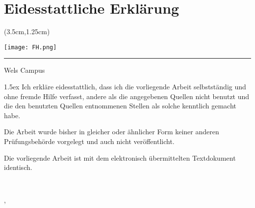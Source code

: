 
	{
	\renewcommand*\chapterheadstartvskip{\vspace*{6.5\topskip}}
	\chapter{Eidesstattliche Erklärung}
	}

	\begin{textblock*}{15cm}(3.5cm,1.25cm)
		\begin{flushright}
			\texttt{[image: FH.png]}
		\end{flushright}
		\rule{15cm}{0.1mm}
		\vspace{-2.2cm}
		\begin{flushright}
			Wels Campus
		\end{flushright}
	\end{textblock*}

	\vfill
	\begin{minipage}[t]{0.33\textwidth}
	\end{minipage}
	\hfill
	\begin{minipage}[t]{0.66\textwidth}
		{\parskip 1.5ex		%
			Ich erkläre eidesstattlich, dass ich die vorliegende Arbeit selbstständig und ohne fremde Hilfe verfasst, andere als die angegebenen Quellen nicht benutzt und die den benutzten Quellen entnommenen Stellen als solche kenntlich gemacht habe.

            Die Arbeit wurde bisher in gleicher oder ähnlicher Form keiner anderen Prüfungsbehörde vorgelegt und auch nicht veröffentlicht.

            Die vorliegende Arbeit ist mit dem elektronisch übermittelten Textdokument identisch.
		}
		\vspace{25mm}

		\begin{minipage}[t]{7.5cm}
			\centering \dotfill \\
		\end{minipage}
		\vskip 6pt
		\printauthor
		\vskip 6pt
		\printlocation, {\printsubmonth\ \printsubyear}
	\end{minipage}
	\vfill